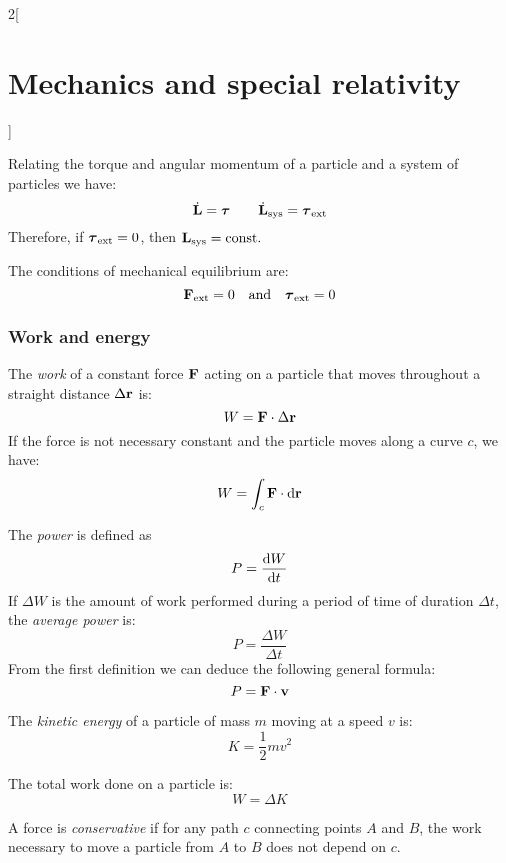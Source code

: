 \documentclass[../../../main.tex]{subfiles}
\begin{document}
\begin{multicols}{2}[\section{Mechanics and special relativity}]
\begin{prop}[Torque]
  \end{prop}
  \begin{prop}
    Relating the torque and angular momentum of a particle and a system of particles we have:
    $$\dot{\boldsymbol{\mathrm{L}}}=\boldsymbol{\mathrm{\tau}}\qquad\dot{\boldsymbol{\mathrm{L}}}_\text{sys}=\boldsymbol{\mathrm{\tau}}_\text{ext}$$ Therefore, if $\boldsymbol{\mathrm{\tau}}_\text{ext}=0$, then $\boldsymbol{\mathrm{L}}_\text{sys}=\text{const}.$
  \end{prop}
  \begin{definition}
    The conditions of mechanical equilibrium are: $$\boldsymbol{\mathrm{F}}_\text{ext}=0\quad\text{and}\quad\boldsymbol{\mathrm{\tau}}_\text{ext}=0$$
  \end{definition}
  \subsubsection{Work and energy}
  \begin{definition}[Work]
    The \textit{work} of a constant force $\boldsymbol{\mathrm{F}}$ acting on a particle that moves throughout a straight distance $\Delta\boldsymbol{\mathrm{r}}$ is: $$ W=\boldsymbol{\mathrm{F}}\cdot\Delta\boldsymbol{\mathrm{r}}$$ If the force is not necessary constant and the particle moves along a curve $c$, we have: $$W=\int_c\boldsymbol{\mathrm{F}}\cdot \dd\boldsymbol{\mathrm{r}}$$
  \end{definition}
  \begin{definition}[Power]
    The \textit{power} is defined as $$P=\dv{W}{t}$$ If $\Delta W$ is the amount of work performed during a period of time of duration $\Delta t$, the \textit{average power} is: $$P=\frac{\Delta W}{\Delta t}$$ From the first definition we can deduce the following general formula: $$P=\boldsymbol{\mathrm{F}}\cdot\boldsymbol{\mathrm{v}}$$
  \end{definition}
  \begin{definition}
    The \textit{kinetic energy} of a particle of mass $m$ moving at a speed $v$ is: $$K=\frac{1}{2}mv^2$$
  \end{definition}
  \begin{theorem}
    The total work done on a particle is:
    $$W=\Delta K$$
  \end{theorem}
  \begin{definition}
    A force is \textit{conservative} if for any path $c$ connecting points $A$ and $B$, the work necessary to move a particle from $A$ to $B$ does not depend on $c$.
  \end{definition}

\end{multicols}
\end{document}
